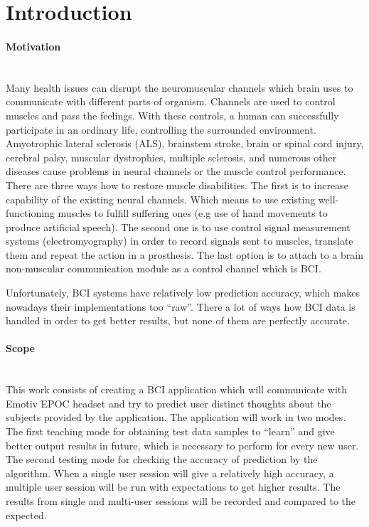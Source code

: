 \documentclass[12pt]{article}
\newcommand{\TODO}{\todo[inline]}
\begin{document}


\newpage
\tableofcontents

\newpage
\section{Introduction}
\paragraph{Motivation}~\\

Many health issues can disrupt the neuromuscular channels which brain uses to communicate with different parts of organism. Channels are used to control muscles and pass the feelings. With these controls, a human can successfully participate in an ordinary life, controlling the surrounded environment. Amyotrophic lateral sclerosis (ALS), brainstem stroke, brain or spinal cord injury, cerebral palsy, muscular dystrophies, multiple sclerosis, and numerous other diseases cause problems in neural channels or the muscle control performance. There are three ways how to restore muscle disabilities. The first is to increase capability of the existing neural channels. Which means to use existing well-functioning muscles to fulfill suffering ones (e.g use of hand movements to produce artificial speech). The second one is to use control signal measurement systems (electromyography) in order to record signals sent to muscles, translate them and repeat the action in a prosthesis. The last option is to attach to a brain non-muscular communication module as a control channel which is BCI.\cite{bci_jonathan}

Unfortunately, BCI systems have relatively low prediction accuracy, which makes nowadays their implementations too “raw”. There a lot of ways how BCI data is handled in order to get better results, but none of them are perfectly accurate.
\paragraph{Scope}~\\

This work consists of creating a BCI application which will communicate with Emotiv EPOC headset and try to predict user distinct thoughts about the subjects provided by the application. The application will work in two modes. The first teaching mode for obtaining test data samples to “learn” and give better output results in future, which is necessary to perform for every new user. The second testing mode for checking the accuracy of prediction by the algorithm. When a single user session will give a relatively high accuracy, a multiple user session will be run with expectations to get higher results. The results from single and multi-user sessions will be recorded and compared to the expected.
\end{document}
